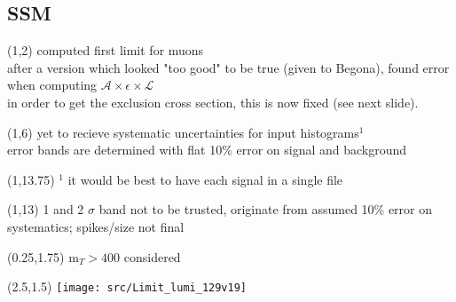 
\subsection{SSM}
\begin{frame}
        \begin{textblock}{14}(1,2) %
            computed first limit for muons\\
            after a version which looked "too good" to be true (given to Begona), found error when computing $\mathcal{A}\times\epsilon\times\mathcal{L}$\\
            in order to get the exclusion cross section, this is now fixed (see next slide).
        \end{textblock}
        \begin{textblock}{14}(1,6) %
            yet to recieve systematic uncertainties for input histograms$^1$\\
            error bands are determined with flat 10\% error on signal and background\\
        \end{textblock}
        \begin{textblock}{14}(1,13.75) %
            $^1$ it would be best to have each signal in a single file
        \end{textblock}
\end{frame}
\begin{frame}
        \begin{textblock}{14}(1,13) %
            1 and 2 $\sigma$ band not to be trusted,
            originate from assumed 10\% error on systematics;
            spikes/size not final
        \end{textblock}
        \begin{textblock}{4.5}(0.25,1.75) %
            m$_T > 400$ considered
        \end{textblock}
        \begin{textblock}{11}(2.5,1.5) %
            \texttt{[image: src/Limit\_lumi\_129v19]}
        \end{textblock}
\end{frame}
